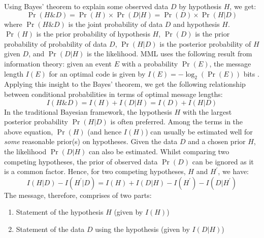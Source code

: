 \documentclass[wcp]{jmlr}
\begin{document}
Using Bayes' theorem to explain some observed data $D$ by hypothesis $H$, we get:
\begin{equation*}
  \Pr(H\&D) = \Pr(H) \times \Pr(D|H) = \Pr(D) \times \Pr(H|D)
\end{equation*}
where $\Pr(H\&D)$ is the joint probability of data $D$ and hypothesis $H$. $\Pr(H)$
is the prior probability of hypothesis $H$, $\Pr(D)$ is the prior probability of 
probability of data $D$, $\Pr(H|D)$ is the posterior probability of $H$
given $D$, and $\Pr(D|H)$ is the likelihood.
MML uses the following result from information theory: given an event $E$
with a probability $\Pr(E)$, the message length $I(E)$ for an optimal
code is given by $I(E) = -\log_2 (\Pr(E))$ bits \citep{shannon1948}. Applying this insight
to the Bayes' theorem, we get the following relationship between
conditional probabilities in terms of optimal message lengths:
\begin{equation*}
  I(H\&D) = I(H) + I(D|H) = I(D) + I(H|D)
\end{equation*}
In the traditional Bayesian framework, the hypothesis $H$ with
the largest posterior probability $\Pr(H|D)$ is often preferred.
Among the terms in the above equation, $\Pr(H)$ (and hence $I(H)$) can
usually be estimated well for \emph{some} reasonable prior(s) on hypotheses.
Given the data $D$ and a chosen prior $H$, the likelihood $\Pr(D|H)$ can also be estimated.
Whilst comparing two competing hypotheses, the prior of observed data $\Pr(D)$
can be ignored as it is a common factor. Hence, for two competing hypotheses, $H$ and $H^\prime$, we have:
\begin{equation*}
I(H|D) - I(H^\prime|D) = I(H) + I(D|H) - I(H^\prime) - I(D|H^\prime)
\end{equation*}
The message, therefore, comprises of two parts: 
\begin{enumerate}
\item Statement of the hypothesis $H$ (given by $I(H)$)  
\item Statement of the data $D$ using the hypothesis (given by $I(D|H)$) 
\end{enumerate}
\end{document}
